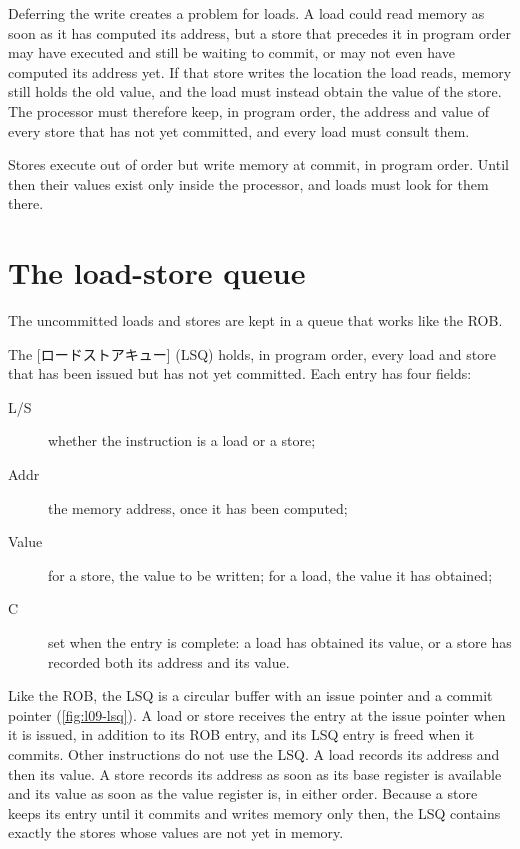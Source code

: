 \documentclass[../main.tex]{subfiles}
\begin{document}
Deferring the write creates a problem for loads.  A load could read memory as
soon as it has computed its address, but a store that precedes it in program
order may have executed and still be waiting to commit, or may not even have
computed its address yet.  If that store writes the location the load reads,
memory still holds the old value, and the load must instead obtain the value of
the store.  The processor must therefore keep, in program order,
the address and value of every store that has not yet committed, and every load
must consult them.

\begin{keypoint}
  Stores execute out of order but write memory at commit, in program order.
  Until then their values exist only inside the processor, and loads must look
  for them there.
\end{keypoint}

\section{The load-store queue}
\label{sec:l09-lsq}

The uncommitted loads and stores are kept in a queue that works like the
ROB.

\begin{definition}
  \label{def:l09-lsq}
  The [ロードストアキュー] (LSQ) holds, in program order, every load and store that has been
  issued but has not yet committed.  Each entry has four fields:
  \begin{description}
    \item[L/S] whether the instruction is a load or a store;
    \item[Addr] the memory address, once it has been computed;
    \item[Value] for a store, the value to be written; for a load, the value
      it has obtained;
    \item[C] set when the entry is complete: a load has obtained its value, or
      a store has recorded both its address and its value.
  \end{description}
\end{definition}

Like the ROB, the LSQ is a circular buffer with an issue pointer and a commit
pointer (\cref{fig:l09-lsq}).  A load or store receives the entry at the issue
pointer when it is issued, in addition to its ROB entry, and its LSQ entry is
freed when it commits.  Other instructions do not use the LSQ.  A load records
its address and then its value.  A store records its address as soon as its
base register is available and its value as soon as the value register is,
in either order.  Because a store keeps its entry until it commits and writes
memory only then, the LSQ contains exactly the stores whose values are not yet
in memory.
\end{document}
